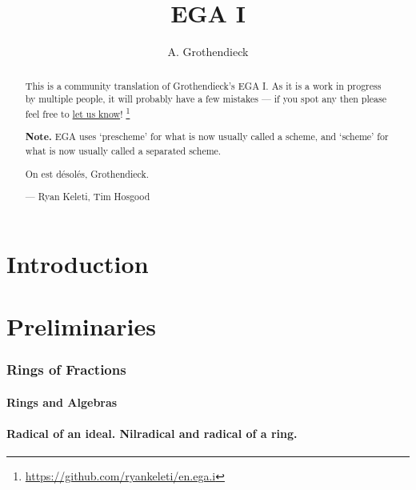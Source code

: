 \documentclass[10pt,oneside]{amsart}
\title{EGA I}
\author{A. Grothendieck}
\begin{document}
\renewcommand{\abstractname}{What this is}
\begin{abstract}
    This is a community translation of Grothendieck's EGA I.
    As it is a work in progress by multiple people, it will probably have a few mistakes --- if you spot any then please feel free to \href{https://github.com/ryankeleti/en.ega.i/issues}{let us know}!
    \thanks{\url{https://github.com/ryankeleti/en.ega.i}}

\noindent
    \textbf{Note.} EGA uses `prescheme' for what is now usually called
    a scheme, and `scheme' for what is now usually called a
    separated scheme.
 
    On est d{\'e}sol{\'e}s, Grothendieck.

    --- Ryan Keleti, Tim Hosgood
\end{abstract}

\maketitle

\noindent\hspace{0.15\linewidth}

\tableofcontents{}

\clearpage

\part*{Introduction}


\clearpage

\setcounter{part}{-1}

\part{Preliminaries}

    \section{Rings of Fractions}
    \setcounter{subsection}{-1}

        \subsection{Rings and Algebras}
        

        \subsection{Radical of an ideal. Nilradical and radical of a ring.}
        
\end{document}
